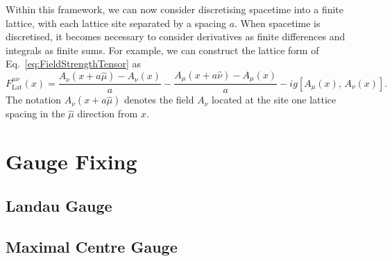 Within this framework, we can now consider discretising spacetime into a finite lattice, with each lattice site separated by a spacing $a$. When spacetime is discretised, it becomes necessary to consider derivatives as finite differences and integrals as finite sums. For example, we can construct the lattice form of Eq.~\ref{eq:FieldStrengthTensor} as
\begin{equation}
F_{\text{Lat}}^{\mu\nu}(x) = \frac{A_\nu(x+a\hat{\mu})-A_\nu(x)}{a}-\frac{A_\mu(x+a\hat{\nu})-A_\mu(x)}{a}-ig[A_\mu(x),\,A_\nu(x)].
\label{eq:DiscreteFST}
\end{equation}
The notation $A_\nu(x+a\hat{\mu})$ denotes the field $A_\nu$ located at the site one lattice spacing in the $\hat{\mu}$ direction from $x$.
\section{Gauge Fixing}
\subsection{Landau Gauge}
\subsection{Maximal Centre Gauge}


%
%
%
%
%
